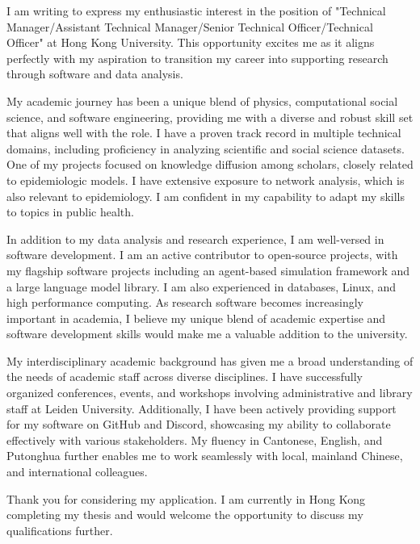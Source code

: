 \documentclass[11pt, a4paper]{awesome-cv}
\begin{document}
\makecvheader[R]

\makecvfooter
  {}%
  {}%
  {}

\makelettertitle

\begin{cvletter}

I am writing to express my enthusiastic interest in the position of "Technical Manager/Assistant Technical Manager/Senior Technical Officer/Technical Officer" at Hong Kong University. This opportunity excites me as it aligns perfectly with my aspiration to transition my career into supporting research through software and data analysis.

My academic journey has been a unique blend of physics, computational social science, and software engineering, providing me with a diverse and robust skill set that aligns well with the role. I have a proven track record in multiple technical domains, including proficiency in analyzing scientific and social science datasets. One of my projects focused on knowledge diffusion among scholars, closely related to epidemiologic models. I have extensive exposure to network analysis, which is also relevant to epidemiology. I am confident in my capability to adapt my skills to topics in public health.

In addition to my data analysis and research experience, I am well-versed in software development. I am an active contributor to open-source projects, with my flagship software projects including an agent-based simulation framework and a large language model library. I am also experienced in databases, Linux, and high performance computing. As research software becomes increasingly important in academia, I believe my unique blend of academic expertise and software development skills would make me a valuable addition to the university.

My interdisciplinary academic background has given me a broad understanding of the needs of academic staff across diverse disciplines. I have successfully organized conferences, events, and workshops involving administrative and library staff at Leiden University. Additionally, I have been actively providing support for my software on GitHub and Discord, showcasing my ability to collaborate effectively with various stakeholders. My fluency in Cantonese, English, and Putonghua further enables me to work seamlessly with local, mainland Chinese, and international colleagues.

Thank you for considering my application. I am currently in Hong Kong completing my thesis and would welcome the opportunity to discuss my qualifications further.

\end{cvletter}


\makeletterclosing
\end{document}
